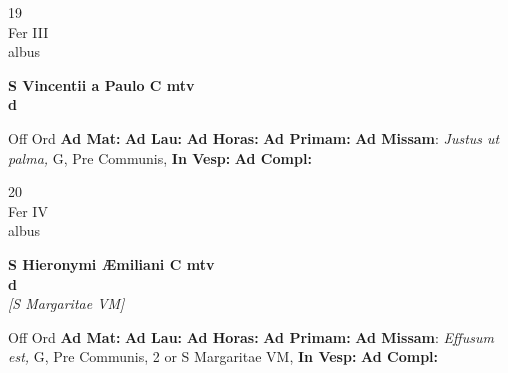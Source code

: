 \documentclass[10pt, openany]{book}
\begin{document}
        \begin{center}
            \begin{minipage}{3.5in}
                \vspace{2em}
                \begin{minipage}{0.5in}
                    {\Huge 19} \\
                    {\normalsize Fer III} \\
                    {\normalsize albus}
                \end{minipage}
                \begin{minipage}{3.0in}
                    \textbf{ \large S Vincentii a Paulo C mtv \\
                    \textnormal{\normalsize d}} \\ 
                \end{minipage}
                \begin{justify}Off Ord
                    \textbf{Ad Mat: }
                    \textbf{Ad Lau: }
                    \textbf{Ad Horas: }
                    \textbf{Ad Primam: }\textbf{Ad Missam}: \textit{Justus ut palma,} G, Pre Communis,  
                    \textbf{In Vesp: }
                    \textbf{Ad Compl: }
                \end{justify}
            \end{minipage}
        \end{center}
    
        \begin{center}
            \begin{minipage}{3.5in}
                \vspace{2em}
                \begin{minipage}{0.5in}
                    {\Huge 20} \\
                    {\normalsize Fer IV} \\
                    {\normalsize albus}
                \end{minipage}
                \begin{minipage}{3.0in}
                    \textbf{ \large S Hieronymi Æmiliani C mtv \\
                    \textnormal{\normalsize d}} \\ \textit{[S Margaritae VM]} \\ 
                \end{minipage}
                \begin{justify}Off Ord
                    \textbf{Ad Mat: }
                    \textbf{Ad Lau: }
                    \textbf{Ad Horas: }
                    \textbf{Ad Primam: }\textbf{Ad Missam}: \textit{Effusum est,} G, Pre Communis, 2 or S Margaritae VM,  
                    \textbf{In Vesp: }
                    \textbf{Ad Compl: }
                \end{justify}
            \end{minipage}
        \end{center}
    
\end{document}
